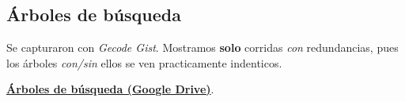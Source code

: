 
\FloatBarrier

\subsection{Árboles de búsqueda}\label{sec:01-sudoku-arboles}
Se capturaron con \textit{Gecode Gist}. Mostramos \textbf{solo} corridas \emph{con} redundancias, pues los árboles \emph{con/sin} ellos se ven practicamente indenticos.

\href{https://drive.google.com/drive/folders/125bijiUVxOe8lKL5cBToh5QjyLDW0jIM?usp=sharing}{\textbf{Árboles de búsqueda (Google Drive)}}.